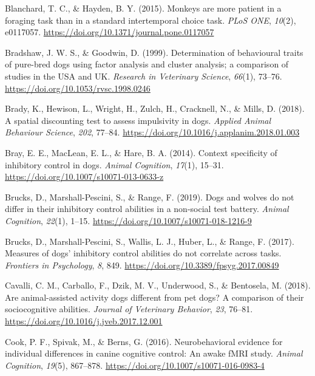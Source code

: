 \documentclass[
  ,pub,floatsintext]{apa6}
\newlength{\cslhangindent}
\newlength{\cslentryspacingunit} %
\newenvironment{CSLReferences}[2] %
 {%
  \setlength{\parindent}{0pt}
  \ifodd #1
  \let\oldpar\par
  \def\par{\hangindent=\cslhangindent\oldpar}
  \fi
  \setlength{\parskip}{#2\cslentryspacingunit}
 }%
 {}
\begin{document}
\begin{CSLReferences}{1}{0}
\leavevmode{}%
Blanchard, T. C., \& Hayden, B. Y. (2015). Monkeys are more patient in a foraging task than in a standard intertemporal choice task. \emph{PLoS ONE}, \emph{10}(2), e0117057. \url{https://doi.org/10.1371/journal.pone.0117057}

\leavevmode{}%
Bradshaw, J. W. S., \& Goodwin, D. (1999). Determination of behavioural traits of pure-bred dogs using factor analysis and cluster analysis; a comparison of studies in the {USA} and {UK}. \emph{Research in Veterinary Science}, \emph{66}(1), 73--76. \url{https://doi.org/10.1053/rvsc.1998.0246}

\leavevmode{}%
Brady, K., Hewison, L., Wright, H., Zulch, H., Cracknell, N., \& Mills, D. (2018). A spatial discounting test to assess impulsivity in dogs. \emph{Applied Animal Behaviour Science}, \emph{202}, 77--84. \url{https://doi.org/10.1016/j.applanim.2018.01.003}

\leavevmode{}%
Bray, E. E., MacLean, E. L., \& Hare, B. A. (2014). Context specificity of inhibitory control in dogs. \emph{Animal Cognition}, \emph{17}(1), 15--31. \url{https://doi.org/10.1007/s10071-013-0633-z}

\leavevmode{}%
Brucks, D., Marshall-Pescini, S., \& Range, F. (2019). Dogs and wolves do not differ in their inhibitory control abilities in a non-social test battery. \emph{Animal Cognition}, \emph{22}(1), 1--15. \url{https://doi.org/10.1007/s10071-018-1216-9}

\leavevmode{}%
Brucks, D., Marshall-Pescini, S., Wallis, L. J., Huber, L., \& Range, F. (2017). Measures of dogs' inhibitory control abilities do not correlate across tasks. \emph{Frontiers in Psychology}, \emph{8}, 849. \url{https://doi.org/10.3389/fpsyg.2017.00849}

\leavevmode{}%
Cavalli, C. M., Carballo, F., Dzik, M. V., Underwood, S., \& Bentosela, M. (2018). Are animal-assisted activity dogs different from pet dogs? {A} comparison of their sociocognitive abilities. \emph{Journal of Veterinary Behavior}, \emph{23}, 76--81. \url{https://doi.org/10.1016/j.jveb.2017.12.001}

\leavevmode{}%
Cook, P. F., Spivak, M., \& Berns, G. (2016). Neurobehavioral evidence for individual differences in canine cognitive control: An awake {fMRI} study. \emph{Animal Cognition}, \emph{19}(5), 867--878. \url{https://doi.org/10.1007/s10071-016-0983-4}


\end{CSLReferences}
\end{document}
